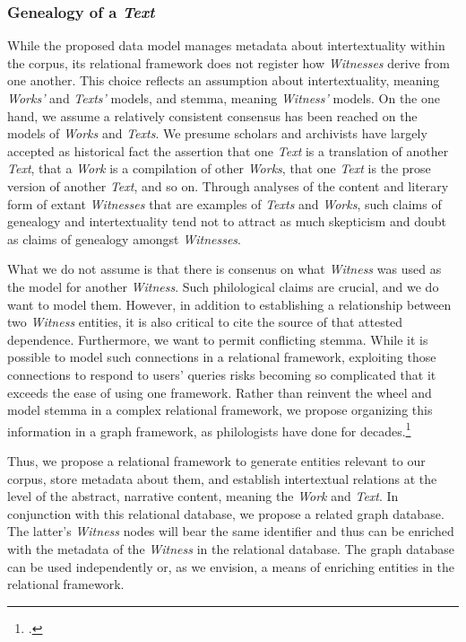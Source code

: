 \subsubsection{Genealogy of a \textit{Text}}

While the proposed data model manages metadata about intertextuality within the corpus, its relational framework does not register how \textit{Witnesses} derive from one another. This choice reflects an assumption about intertextuality, meaning \textit{Works'} and \textit{Texts'} models, and stemma, meaning \textit{Witness'} models. On the one hand, we assume a relatively consistent consensus has been reached on the models of \textit{Works} and \textit{Texts}. We presume scholars and archivists have largely accepted as historical fact the assertion that one \textit{Text} is a translation of another \textit{Text}, that a \textit{Work} is a compilation of other \textit{Works}, that one \textit{Text} is the prose version of another \textit{Text}, and so on. Through analyses of the content and literary form of extant \textit{Witnesses} that are examples of \textit{Texts} and \textit{Works}, such claims of genealogy and intertextuality tend not to attract as much skepticism and doubt as claims of genealogy amongst \textit{Witnesses}.

What we do not assume is that there is consenus on what \textit{Witness} was used as the model for another \textit{Witness}. Such philological claims are crucial, and we do want to model them. However, in addition to establishing a relationship between two \textit{Witness} entities, it is also critical to cite the source of that attested dependence. Furthermore, we want to permit conflicting stemma. While it is possible to model such connections in a relational framework, exploiting those connections to respond to users' queries risks becoming so complicated that it exceeds the ease of using one framework. Rather than reinvent the wheel and model stemma in a complex relational framework, we propose organizing this information in a graph framework, as philologists have done for decades.\footcite[][]{Zundert2020}

Thus, we propose a relational framework to generate entities relevant to our corpus, store metadata about them, and establish intertextual relations at the level of the abstract, narrative content, meaning the \textit{Work} and \textit{Text}. In conjunction with this relational database, we propose a related graph database. The latter's \textit{Witness} nodes will bear the same identifier and thus can be enriched with the metadata of the \textit{Witness} in the relational database. The graph database can be used independently or, as we envision, a means of enriching entities in the relational framework.

